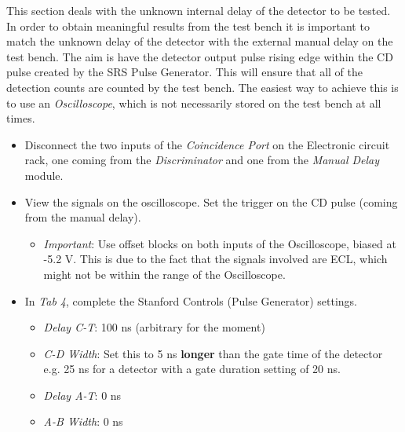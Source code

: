 \documentclass{article}
\begin{document}
This section deals with the unknown internal delay of the detector to be tested. In order to obtain meaningful results from the test bench it is important to match the unknown delay of the detector with the external manual delay on the test bench. The aim is have the detector output pulse rising edge within the CD pulse created by the SRS Pulse Generator. This will ensure that all of the detection counts are counted by the test bench. The easiest way to achieve this is to use an \emph{Oscilloscope}, which is not necessarily stored on the test bench at all times.

\begin{itemize}
\item
Disconnect the two inputs of the \emph{Coincidence Port} on the Electronic circuit rack, one coming from the \emph{Discriminator} and one from the \emph{Manual Delay} module. 

\item
View the signals on the oscilloscope. Set the trigger on the CD pulse (coming from the manual delay).
\begin{itemize}
\item
\emph{Important}: Use offset blocks on both inputs of the Oscilloscope, biased at -5.2 V. This is due to the fact that the signals involved are ECL, which might not be within the range of the Oscilloscope.
\end{itemize}

\item 
In \emph{Tab 4}, complete the Stanford Controls (Pulse Generator) settings. 
\begin{itemize}
\item
\emph{Delay C-T}: 100 ns (arbitrary for the moment)
\item
\emph{C-D Width}: Set this to 5 ns {\bf longer} than the gate time of the detector e.g. 25 ns for a detector with a gate duration setting of 20 ns.
\item
\emph{Delay A-T}: 0 ns
\item
\emph{A-B Width}: 0 ns
\end{itemize}


\end{itemize}
\end{document}
